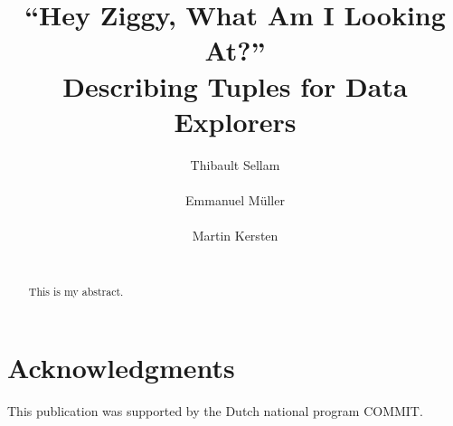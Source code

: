 \documentclass{sig-alternate-2013}
\begin{document}
\title{``Hey Ziggy, What Am I Looking At?''\\
Describing Tuples for Data Explorers}

\author{
\alignauthor
Thibault Sellam\\
       \\
\alignauthor
Emmanuel M\"uller\\
    \\
\alignauthor
Martin Kersten\\
       \\
}

\maketitle

\begin{abstract}
    This is my abstract.
\end{abstract}





\section{Acknowledgments}
This publication was supported by the Dutch national program COMMIT.



\end{document}

